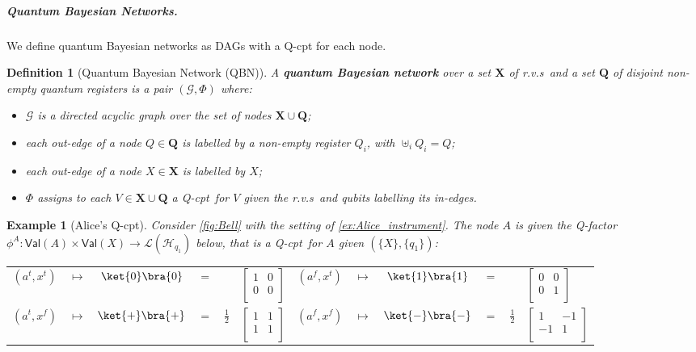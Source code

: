 \documentclass[10pt,a4paper]{article}
\newcommand*{\definitive}[1]{\textbf{#1}}
\newcommand*{\G}{\mathcal{G}}
\newcommand*{\setofrv}[1]{\mathsf{Val}(#1)}
\newcommand{\bX}{\mathbf X}
\renewcommand{\L}{\mathcal{L}}
\newcommand{\HH}{\mathcal{H}}
\newcommand{\reg}{Q}
\newcommand{\qreg}{\reg}
\newcommand{\bQ}{\mathbf Q}
\newcommand*{\someqfact}{\phi}
\newcommand*{\someqfactset}{\Phi}
\newcommand{\rvs}{r.v.s\xspace}
\newcommand*{\qfactor}{Q-factor}
\newcommand*{\qCPT}{Q-\textsf{cpt}\xspace}
\newcommand*{\qqbn}{\textsf{QBN}}
\newtheorem{definition}[theorem]{Definition}
\newtheorem{example}[theorem]{Example}
\begin{document}
\subparagraph{Quantum Bayesian Networks.}

We define quantum Bayesian networks as DAGs with a \qCPT for each node.

\begin{definition}[Quantum Bayesian Network (\qqbn)]
A \definitive{quantum Bayesian network} over a set $\bX$ of \rvs\ and a set $\bQ$ of disjoint non-empty quantum registers is a pair $(\G,\someqfactset)$ where:
\begin{itemize}
\item
$\G$ is a directed acyclic graph over the set of nodes $\bX\cup\bQ$;
\item
each out-edge of a node $\qreg\in\bQ$ is labelled by a non-empty register $\qreg_i$, with $\uplus_i \qreg_i = \qreg$;
\item
each out-edge of a node $X\in\bX$ is labelled by $X$;
\item
$\someqfactset$ assigns to each $V \in \bX\cup\bQ$ a \qCPT\ for $V$ given the \rvs\ and qubits labelling its in-edges.
\end{itemize}
\end{definition}

\begin{example}[Alice's \qCPT]
Consider \cref{fig:Bell} with the setting of \cref{ex:Alice_instrument}.
The node $A$ is given the \qfactor\ $\someqfact^A: \setofrv{A}\times\setofrv{X} \to \L(\HH_{q_1})$ below, that is a \qCPT\ for $A$ given $(\{X\},\{q_1\})$:

\begin{adjustbox}{}
\begin{tabular}{ccc@{ }c@{ }l@{}l@{\qquad\qquad}ccc@{ }c@{ }l@{}l}
$(a^t,x^t)$ & $\mapsto$ & $\ket{0}\bra{0}$ & $=$ &
&
$\left[\begin{smallmatrix}
1 & 0\\
0 & 0\\
\end{smallmatrix}\right]$
&
$(a^f,x^t)$ & $\mapsto$ & $\ket{1}\bra{1}$ & $=$ &
&
$\left[\begin{smallmatrix}
0 & 0\\
0 & 1\\
\end{smallmatrix}\right]$
\\
$(a^t,x^f)$ & $\mapsto$ & $\ket{+}\bra{+}$ & $=$ &
$\frac{1}{2}$
&
$\left[\begin{smallmatrix}
1 & 1\\
1 & 1\\
\end{smallmatrix}\right]$
&
$(a^f,x^f)$ & $\mapsto$ & $\ket{-}\bra{-}$ & $=$ &
$\frac{1}{2}$
&
$\left[\begin{smallmatrix}
1 & -1\\
-1 & 1\\
\end{smallmatrix}\right]$
\end{tabular}
\end{adjustbox}
\end{example}
\end{document}

